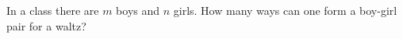 In a class there are $m$ boys and $n$ girls. How many ways can one form a boy-girl pair for a waltz?
